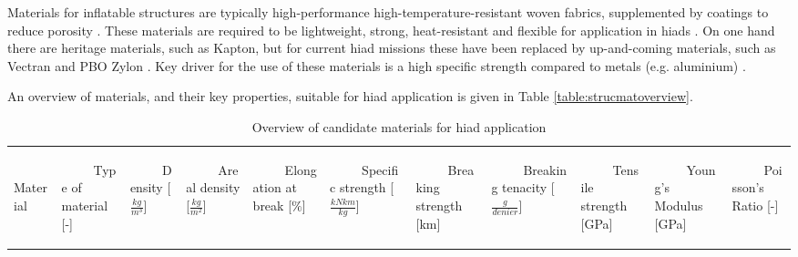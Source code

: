 Materials for inflatable structures are typically high-performance high-temperature-resistant woven fabrics, supplemented by coatings to reduce porosity \cite{Jenkins2001}. These materials are required to be lightweight, strong, heat-resistant and flexible for application in \glspl{hiad} \cite{Samareh2010}. On one hand there are heritage materials, such as Kapton, but for current \gls{hiad} missions these have been replaced by up-and-coming materials, such as Vectran and PBO Zylon \cite{Dillman2012,  Smith2010}. Key driver for the use of these materials is a high specific strength compared to metals (e.g. aluminium) \cite{Samareh2010}. 

An overview of materials, and their key properties, suitable for \gls{hiad} application is given in Table \ref{table:strucmatoverview}. 

\begin{table}[H]
\caption{Overview of candidate materials for \gls{hiad} application}
\vspace{45mm}
\hspace{-9mm}
\begin{tabular}{p{}|p{}|p{}|p{}|p{}|p{}|p{}|p{}|p{}|p{}|p{}|}
\begin{rotate}{60} ~~~~~Material \end{rotate}  &  \begin{rotate}{60} ~~~~~Type of material {[}-{]}  \end{rotate} & \begin{rotate}{60} ~~~~~Density [$\frac{kg}{m^3}$] \end{rotate}& \begin{rotate}{60} ~~~~~Areal density [$\frac{kg}{m^2}$] \end{rotate} & \begin{rotate}{60} ~~~~~Elongation at break [$\%$] \end{rotate} & \begin{rotate}{60} ~~~~~Specific strength [$\frac{kN km}{kg}$]\end{rotate} &  \begin{rotate}{60} ~~~~~Breaking strength [km]\end{rotate} & \begin{rotate}{60} ~~~~~Breaking tenacity [$\frac{g}{denier}$]\end{rotate}&  \begin{rotate}{60} ~~~~~Tensile strength [GPa] \end{rotate} & \begin{rotate}{60} ~~~~~Young's Modulus [GPa] \end{rotate} & \begin{rotate}{60} ~~~~~Poisson's Ratio [-] \end{rotate} \\

\end{tabular}
\end{table}
